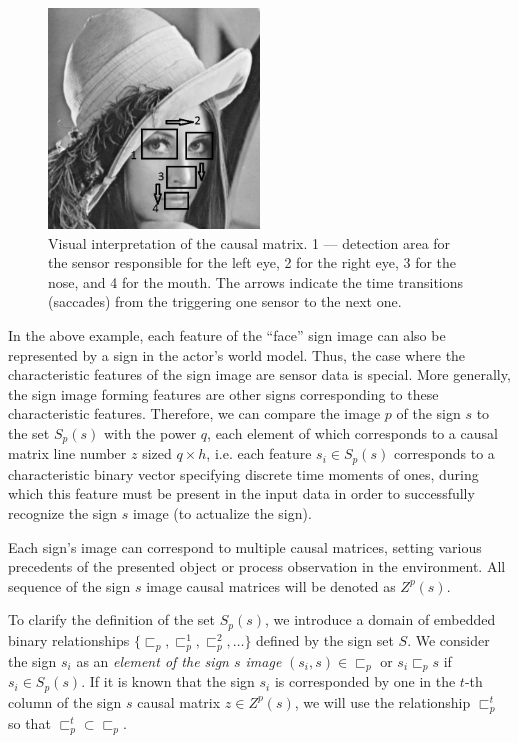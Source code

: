 \documentclass[review]{elsarticle}
\begin{document}
\begin{figure}
	\label{fig:face}
	\centering
	\includegraphics[width=0.5\textwidth]{misc/photos/face}
	\caption{Visual interpretation of the causal matrix. 1 --- detection area for the sensor responsible for the left eye, 2 for the right eye, 3 for the nose, and 4 for the mouth. The arrows indicate the time transitions (saccades) from the triggering one sensor to the next one.}		
\end{figure}

In the above example, each feature of the ``face'' sign image can also be represented by a sign in the actor’s world model. Thus, the case where the characteristic features of the sign image are sensor data is special. More generally, the sign image forming features are other signs corresponding to these characteristic features. Therefore, we can compare the image $p$ of the sign $s$ to the set $S_p(s)$ with the power $q$, each element of which corresponds to a causal matrix line number $z$ sized $q\times h$, i.e. each feature $s_i\in S_p(s)$ corresponds to a characteristic binary vector specifying discrete time moments of ones, during which this feature must be present in the input data in order to successfully recognize the sign $s$ image (to actualize the sign).

Each sign’s image can correspond to multiple causal matrices, setting various precedents of the presented object or process observation in the environment. All sequence of the sign $s$ image causal matrices will be denoted as $Z^p(s)$.

To clarify the definition of the set $S_p(s)$, we introduce a domain of embedded binary relationships $\{\sqsubset_p,\sqsubset_p^1,\sqsubset_p^2,\dots\}$ defined by the sign set $S$. We consider the sign $s_i$ as an \textit{element of the sign $s$ image} $(s_i,s)\in\sqsubset_p$ or $s_i\sqsubset_p s$ if $s_i\in S_p(s)$. If it is known that the sign $s_i$ is corresponded by one in the $t$-th column of the sign $s$ causal matrix $z\in Z^p(s)$, we will use the relationship $\sqsubset_p^t$ so that $\sqsubset_p^t\subset \sqsubset_p$.
\end{document}
